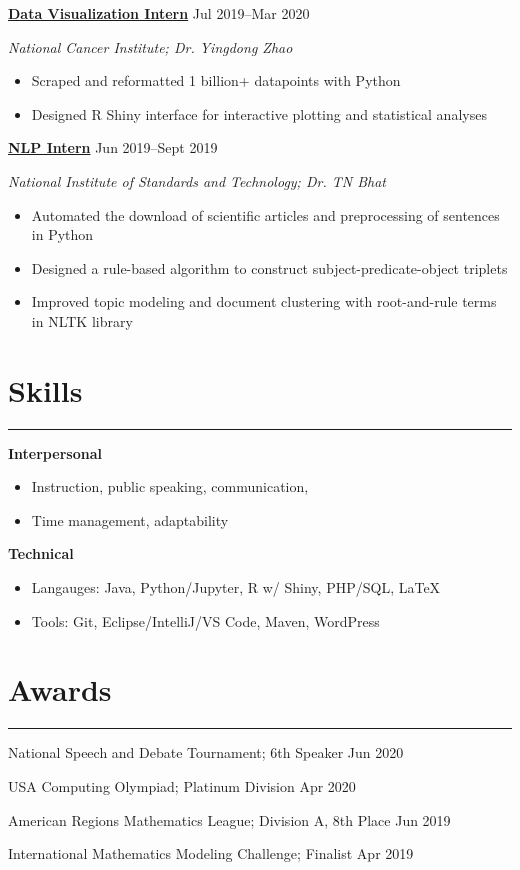 \documentclass[11pt]{article}
\newcommand{\resumesection}[1]{\vspace{-0.3cm}\section*{\color{highlight}#1}\vspace{-0.3cm}\hrule\vspace{0.3cm}}
\begin{document}
\textbf{\href{https://github.com/petezh/TP-Workbench}{Data Visualization Intern}} \hfill Jul 2019--Mar 2020 \par
\textit{National Cancer Institute; Dr. Yingdong Zhao}
\begin{itemize}
	\item Scraped and reformatted 1 billion+ datapoints with Python
	\item Designed R Shiny interface for interactive plotting and statistical analyses
\end{itemize}\vspace{0.1cm}

\textbf{\href{https://github.com/petezh/Root-and-Rule-NLP}{NLP Intern}} \hfill Jun 2019--Sept 2019\par
\textit{National Institute of Standards and Technology; Dr. TN Bhat}
\begin{itemize}
	\item Automated the download of scientific articles and preprocessing of sentences in Python
	\item Designed a rule-based algorithm to construct subject-predicate-object triplets
	\item Improved topic modeling and document clustering with root-and-rule terms in NLTK library
\end{itemize}\vspace{0.1cm}


\resumesection{Skills}

\textbf{Interpersonal}
\begin{itemize} 
	\item Instruction, public speaking, communication, 
	\item Time management, adaptability
\end{itemize}\vspace{0.1cm}

\textbf{Technical}
\begin{itemize} 
	\item Langauges: Java, Python/Jupyter, R w/ Shiny, PHP/SQL, \LaTeX
	\item Tools: Git, Eclipse/IntelliJ/VS Code, Maven, WordPress
\end{itemize}\vspace{0.1cm}

\resumesection{Awards}

National Speech and Debate Tournament; 6th Speaker \hfill Jun 2020 \par
USA Computing Olympiad; Platinum Division \hfill Apr 2020 \par
American Regions Mathematics League; Division A, 8th Place \hfill Jun 2019 \par
International Mathematics Modeling Challenge; Finalist \hfill Apr 2019\par
\end{document}
